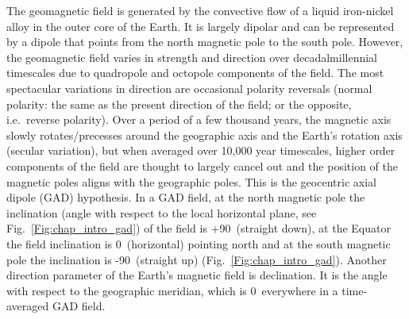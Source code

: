 The geomagnetic field is generated by the convective flow of a liquid
iron-nickel alloy in the outer core of the Earth. It is largely dipolar and can
be represented by a dipole that points from the north magnetic pole to the south
pole. However, the geomagnetic field varies in strength and direction over
decadal\textendash{}millennial timescales due to quadropole and octopole
components of the field. The most spectacular variations in direction are
occasional polarity reversals (normal polarity: the same as the present
direction of the field; or the opposite, i.e.\ reverse polarity). Over a period
of a few thousand years, the magnetic axis slowly rotates/precesses around the
geographic axis and the Earth's rotation axis (secular variation), but when
averaged over 10,000 year timescales, higher order components of the field are
thought to largely cancel out and the position of the magnetic poles aligns with
the geographic poles. This is the geocentric axial dipole (GAD) hypothesis. In a
GAD field, at the north magnetic pole the inclination (angle with respect to the
local horizontal plane, see Fig.~\ref{Fig:chap_intro_gad}) of the field is
+90\degree\ (straight down), at the Equator the field inclination is 0\degree\
(horizontal) pointing north and at the south magnetic pole the inclination is
-90\degree\ (straight up) (Fig.~\ref{Fig:chap_intro_gad}). Another direction
parameter of the Earth's magnetic field is declination. It is the angle with
respect to the geographic meridian, which is 0\degree\ everywhere in a
time-averaged GAD field.

